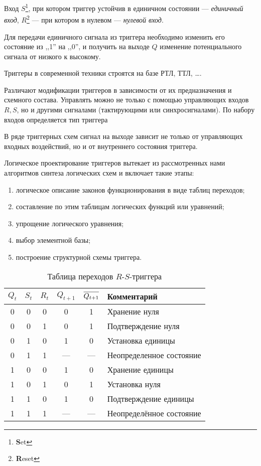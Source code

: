 \documentclass[10pt,a4paper,titlepage]{article}
\begin{document}
Вход $S$\footnote{\textbf{S}et}, при котором триггер устойчив в единичном состоянии --- \textit{единичный вход}, $R$\footnote{\textbf{R}eset} --- при котором в нулевом --- \textit{нулевой вход}.

Для передачи единичного сигнала из триггера необходимо изменить его состояние из ,,1'' на ,,0'', и получить на выходе $Q$ изменение потенциального сигнала от низкого к высокому.

Триггеры в современной техники строятся на базе РТЛ, ТТЛ, \dots.

Различают модификации триггеров в зависимости от их предназначения и схемного состава.
Управлять можно не только с помощью управляющих входов $R, S$, но и другими сигналами (тактирующими или синхросигналами).
По набору входов определяется тип триггера

В ряде триггерных схем сигнал на выходе зависит не только от управляющих входных воздействий, но и от внутреннего состояния триггера.

Логическое проектирование триггеров вытекает из рассмотренных нами алгоритмов синтеза логических схем и включает такие этапы:
\begin{enumerate}
\item логическое описание законов функционирования в виде таблиц переходов;
\item составление по этим таблицам логических функций или уравнений;
\item упрощение логического уравнения;
\item выбор элементной базы;
\item построение структурной схемы триггера.
\end{enumerate}

\begin{longtable}{|c|c|c|c|c|l|}
\caption{Таблица переходов $R$-$S$-триггера}\\
\hline
$Q_t$	&	$S_t$	&	$R_t$	&	$Q_{t+1}$	&	$\overline{\mathstrut Q_{t+1}}$	&	Комментарий\\
\hline
0	&	0	&	0	&	0	&	1	&	Хранение нуля\\
0	&	0	&	1	&	0	&	1	&	Подтверждение нуля\\
0	&	1	&	0	&	1	&	0	&	Установка единицы\\
0	&	1	&	1	&	---	&	---	&	Неопределенное состояние\\
1	&	0	&	0	&	1	&	0	&	Хранение единицы\\
1	&	0	&	1	&	0	&	1	&	Установка нуля\\
1	&	1	&	0	&	1	&	0	&	Подтверждение единицы\\
1	&	1	&	1	&	---	&	---	&	Неопределённое состояние\\
\hline
\end{longtable}
\end{document}
